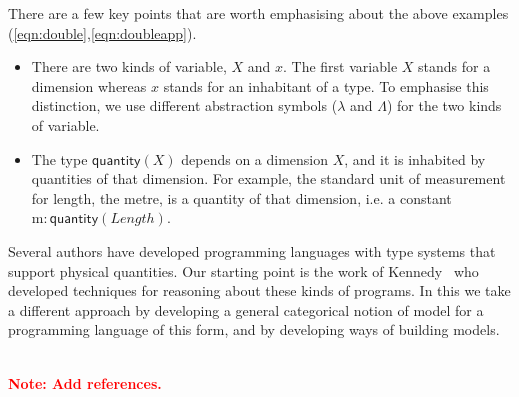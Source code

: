 \documentclass[a4paper,UKenglish]{lipics}
\newcommand\note[1]{{ \bf \textcolor{red} {\vspace{2mm}\; \\ Note: #1\\}}}
\newcommand{\msf}[1]{\mathsf{#1}} %
\newcommand{\qnt}{\msf{quantity}}
\newcommand{\lengthDim}{\mathit{Length}}
\newcommand{\Dvar}{X}
\begin{document}
\noindent There are a few key points that are worth emphasising about the above examples (\eqref{eqn:double},\eqref{eqn:doubleapp}).
\begin{itemize}
\item There are two kinds of variable, $\Dvar$ and $x$. The first variable $\Dvar$ stands for a dimension whereas $x$ stands for an inhabitant of a type. To emphasise this distinction, we use different abstraction symbols ($\lambda$ and $\Lambda$) for the two kinds of variable.
\item The type $\qnt(\Dvar)$ depends on a dimension $\Dvar$, and it is inhabited by quantities of that dimension. For example, the standard unit of measurement for length, the metre, is a quantity of that dimension, i.e. a constant $\mathrm m:\qnt(\lengthDim)$.
\end{itemize}

Several authors have developed programming languages with type systems that support physical quantities. Our starting point is the work of Kennedy~\cite{Kennedy:1997:RPU:263699.263761} who developed techniques for reasoning about these kinds of programs. In this we take a different approach by developing a general categorical notion of model for a programming language of this form, and by developing ways of building models.

\note{Add references.}
\end{document}
